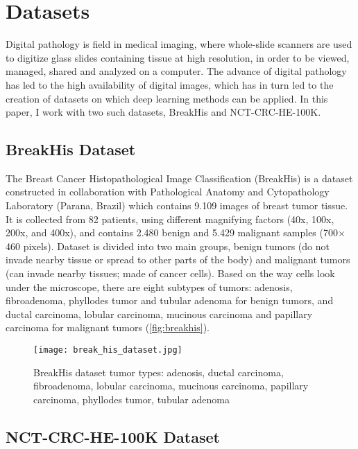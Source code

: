 \section{Datasets}
Digital pathology is field in medical imaging, where whole-slide scanners are used to digitize glass slides containing tissue at high resolution, in order to be viewed, managed, shared and analyzed on a computer. The advance of digital pathology has led to the high availability of digital images, which has in turn led to the creation of datasets on which deep learning methods can be applied. In this paper, I work with two such datasets, BreakHis and NCT-CRC-HE-100K.

\subsection{BreakHis Dataset}

The Breast Cancer Histopathological Image Classification \cite{breakhis_article} (BreakHis) is a dataset constructed in collaboration with Pathological Anatomy and Cytopathology Laboratory (Parana, Brazil) which contains 9.109 images of breast tumor tissue. It is collected from 82 patients, using different magnifying factors (40x, 100x, 200x, and 400x), and contains 2.480  benign and 5.429 malignant samples (700$\times$460 pixels). Dataset is divided into two main groups, benign tumors (do not invade nearby tissue or spread to other parts of the body) and malignant tumors (can invade nearby tissues; made of cancer cells). Based on the way cells look under the microscope, there are eight subtypes of tumors: adenosis, fibroadenoma, phyllodes tumor and tubular adenoma for benign tumors, and ductal carcinoma, lobular carcinoma, mucinous carcinoma and papillary carcinoma for malignant tumors (\textcolor{red}{\autoref{fig:breakhis}}).

\captionsetup[figure]{font=scriptsize,labelfont=scriptsize}

\begin{figure}[h]
	\centering
	\texttt{[image: break\_his\_dataset.jpg]}
	\caption{BreakHis dataset tumor types: adenosis, ductal carcinoma, fibroadenoma, lobular carcinoma, mucinous carcinoma, papillary carcinoma, phyllodes tumor, tubular adenoma}
	\label{fig:breakhis}
\end{figure}

\subsection{NCT-CRC-HE-100K Dataset}

